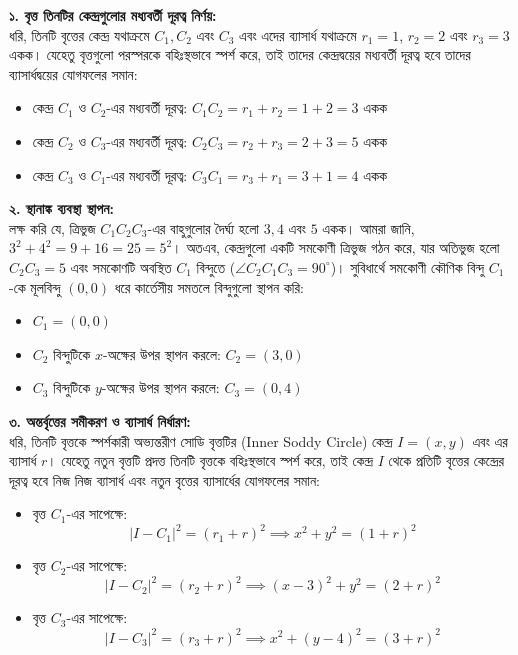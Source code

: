 \documentclass[12pt, a4paper]{article}
\begin{document}
\begin{tcolorbox}[solutionbox={সমাধান (Solution)}]
    \noindent
    \textbf{১. বৃত্ত তিনটির কেন্দ্রগুলোর মধ্যবর্তী দূরত্ব নির্ণয়:} \\
    ধরি, তিনটি বৃত্তের কেন্দ্র যথাক্রমে $C_1, C_2$ এবং $C_3$ এবং এদের ব্যাসার্ধ যথাক্রমে $r_1 = 1$, $r_2 = 2$ এবং $r_3 = 3$ একক। 
    যেহেতু বৃত্তগুলো পরস্পরকে বহিঃস্থভাবে স্পর্শ করে, তাই তাদের কেন্দ্রদ্বয়ের মধ্যবর্তী দূরত্ব হবে তাদের ব্যাসার্ধদ্বয়ের যোগফলের সমান:
    \begin{itemize}
        \item কেন্দ্র $C_1$ ও  $C_2$-এর মধ্যবর্তী দূরত্ব: $C_1 C_2 = r_1 + r_2 = 1 + 2 = 3$ একক
        \item কেন্দ্র $C_2$ ও $C_3$-এর মধ্যবর্তী দূরত্ব: $C_2 C_3 = r_2 + r_3 = 2 + 3 = 5$ একক
        \item কেন্দ্র $C_3$ ও $C_1$-এর মধ্যবর্তী দূরত্ব: $C_3 C_1 = r_3 + r_1 = 3 + 1 = 4$ একক
    \end{itemize}
    
    \vspace{0.5em}
    \textbf{২. স্থানাঙ্ক ব্যবস্থা স্থাপন:} \\
    লক্ষ করি যে, ত্রিভুজ $C_1 C_2 C_3$-এর বাহুগুলোর দৈর্ঘ্য হলো $3, 4$ এবং $5$ একক। 
    আমরা জানি, $3^2 + 4^2 = 9 + 16 = 25 = 5^2$। 
    অতএব, কেন্দ্রগুলো একটি সমকোণী ত্রিভুজ গঠন করে, যার অতিভুজ হলো $C_2 C_3 = 5$ এবং সমকোণটি অবস্থিত $C_1$ বিন্দুতে ($\angle C_2 C_1 C_3 = 90^\circ$)।
    সুবিধার্থে সমকোণী কৌণিক বিন্দু  $C_1$-কে মূলবিন্দু $(0, 0)$ ধরে কার্তেসীয় সমতলে বিন্দুগুলো স্থাপন করি:
    \begin{itemize}
        \item $C_1 = (0, 0)$
        \item $C_2$ বিন্দুটিকে $x$-অক্ষের উপর স্থাপন করলে:  $C_2 = (3, 0)$
        \item $C_3$ বিন্দুটিকে   $y$-অক্ষের উপর স্থাপন করলে: $C_3 = (0, 4)$
    \end{itemize}
    
    \vspace{0.5em}
    \textbf{৩. অন্তর্বৃত্তের সমীকরণ ও ব্যাসার্ধ নির্ধারণ:} \\
    ধরি, তিনটি বৃত্তকে স্পর্শকারী অভ্যন্তরীণ সোডি বৃত্তটির (Inner Soddy Circle) কেন্দ্র  $I = (x, y)$ এবং এর ব্যাসার্ধ  $r$। 
    যেহেতু নতুন বৃত্তটি প্রদত্ত তিনটি বৃত্তকে বহিঃস্থভাবে স্পর্শ করে, তাই কেন্দ্র  $I$ থেকে প্রতিটি বৃত্তের কেন্দ্রের দূরত্ব হবে নিজ নিজ ব্যাসার্ধ এবং নতুন বৃত্তের ব্যাসার্ধের যোগফলের সমান:
    \begin{itemize}
        \item বৃত্ত $C_1$-এর সাপেক্ষে: 
        \[ |I - C_1|^2 = (r_1 + r)^2 \implies x^2 + y^2 = (1 + r)^2 \]
        \item বৃত্ত $C_2$-এর সাপেক্ষে: 
        \[ |I - C_2|^2 = (r_2 + r)^2 \implies (x - 3)^2 + y^2 = (2 + r)^2 \]
        \item বৃত্ত $C_3$-এর সাপেক্ষে: 
        \[ |I - C_3|^2 = (r_3 + r)^2 \implies x^2 + (y - 4)^2 = (3 + r)^2 \]
    \end{itemize}
    

\end{tcolorbox}
\end{document}
